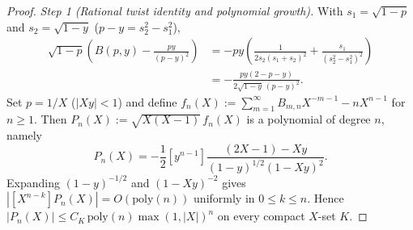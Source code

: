 \documentclass[twoside,10pt]{article}
\numberwithin{equation}{section}
\theoremstyle{slbody}
\theoremstyle{definition}
\theoremstyle{remark}
\begin{document}
\begin{proof}
\emph{Step 1 (Rational twist identity and polynomial growth).}  With
\(s_1=\sqrt{1-p}\) and \(s_2=\sqrt{1-y}\) (\(p-y=s_2^2-s_1^2\)),
\begin{align*}
 \sqrt{1-p}\left(B(p,y)-\frac{py}{(p-y)^2}\right)
 &=-py\left(\frac{1}{2s_2(s_1+s_2)^2}+\frac{s_1}{(s_2^2-s_1^2)^2}\right)\\
 &=-\frac{py(2-p-y)}{2\sqrt{1-y}\,(p-y)^2}.
\end{align*}
Set \(p=1/X\) (\(|Xy|<1\)) and define
\(f_n(X):=\sum_{m=1}^\infty B_{m,n}X^{-m-1}-nX^{n-1}\) for \(n\geq1\).  Then
\(P_n(X):=\sqrt{X(X-1)}\,f_n(X)\) is a polynomial of degree \(n\), namely
\[
 P_n(X)=-\frac12[y^{n-1}]\frac{(2X-1)-Xy}{(1-y)^{1/2}(1-Xy)^2}.
\]
Expanding \((1-y)^{-1/2}\) and \((1-Xy)^{-2}\) gives
\(|[X^{n-k}]P_n(X)|=O(\mathrm{poly}(n))\) uniformly in \(0\leq k\leq n\).
Hence \(|P_n(X)|\leq C_K\,\mathrm{poly}(n)\max(1,|X|)^n\) on every compact
\(X\)-set \(K\).


\end{proof}
\end{document}

